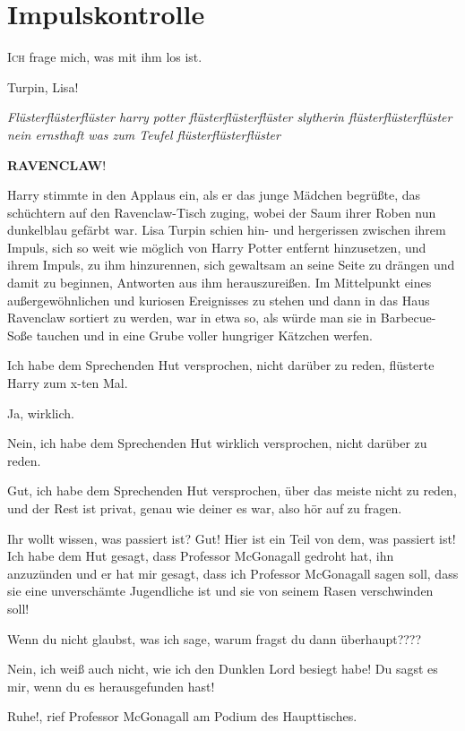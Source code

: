 \chapter{Impulskontrolle}

\lettrine{\loq I}{ch} frage mich, was mit ihm los ist.\grqq{}

\glqq Turpin, Lisa!\grqq{}

\emph{Flüsterflüsterflüster harry potter flüsterflüsterflüster slytherin
flüsterflüsterflüster nein ernsthaft was zum Teufel flüsterflüsterflüster}

\glqq \textbf{RAVENCLAW}!\grqq{}

Harry stimmte in den Applaus ein, als er das junge Mädchen begrüßte, das
schüchtern auf den Ravenclaw-Tisch zuging, wobei der Saum ihrer Roben nun
dunkelblau gefärbt war. Lisa Turpin schien hin- und hergerissen zwischen ihrem
Impuls, sich so weit wie möglich von Harry Potter entfernt hinzusetzen, und
ihrem Impuls, zu ihm hinzurennen, sich gewaltsam an seine Seite zu drängen und
damit zu beginnen, Antworten aus ihm herauszureißen. Im Mittelpunkt eines
außergewöhnlichen und kuriosen Ereignisses zu stehen und dann in das Haus
Ravenclaw sortiert zu werden, war in etwa so, als würde man sie in Barbecue-Soße
tauchen und in eine Grube voller hungriger Kätzchen werfen.

\glqq Ich habe dem Sprechenden Hut versprochen, nicht darüber zu reden\grqq{},
flüsterte Harry zum x-ten Mal.

\glqq Ja, wirklich.\grqq{}

\glqq Nein, ich habe dem Sprechenden Hut wirklich versprochen, nicht darüber zu
reden.\grqq{}

\glqq Gut, ich habe dem Sprechenden Hut versprochen, über das meiste nicht zu
reden, und der Rest ist privat, genau wie deiner es war, also hör auf zu
fragen.\grqq{}

\glqq Ihr wollt wissen, was passiert ist? Gut! Hier ist ein Teil von dem, was
passiert ist! Ich habe dem Hut gesagt, dass Professor McGonagall gedroht hat,
ihn anzuzünden und er hat mir gesagt, dass ich Professor McGonagall sagen soll,
dass sie eine unverschämte Jugendliche ist und sie von seinem Rasen verschwinden
soll!\grqq{}

\glqq Wenn du nicht glaubst, was ich sage, warum fragst du dann
überhaupt????\grqq{}

\glqq Nein, ich weiß auch nicht, wie ich den Dunklen Lord besiegt habe! Du sagst
es mir, wenn du es herausgefunden hast!\grqq{}

\glqq Ruhe!\grqq{}, rief Professor McGonagall am Podium des Haupttisches.

